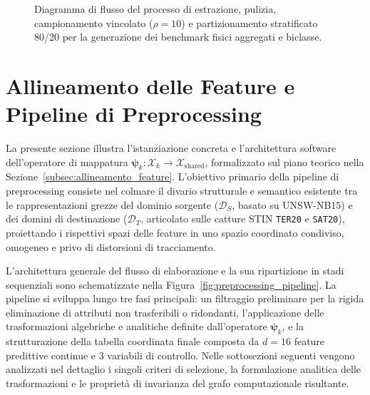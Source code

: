 \begin{figure}[H]
\caption{Diagramma di flusso del processo di estrazione, pulizia, campionamento vincolato ($\rho=10$) e partizionamento stratificato 80/20 per la generazione dei benchmark fisici aggregati e biclasse.}
\label{fig:benchmark_generation_pipeline}
\end{figure}


\section{Allineamento delle Feature e Pipeline di Preprocessing}
\label{sec:preprocessing_implementazione}

La presente sezione illustra l'istanziazione concreta e l'architettura software dell'operatore di mappatura $\boldsymbol{\psi}_k : \mathcal{X}_k \to \mathcal{X}_{\text{shared}}$, formalizzato sul piano teorico nella Sezione~\ref{subsec:allineamento_feature}. 
L'obiettivo primario della pipeline di preprocessing consiste nel colmare il divario strutturale e semantico esistente tra le rappresentazioni grezze del dominio sorgente ($\mathcal{D}_S$, basato su UNSW-NB15) e dei domini di destinazione ($\mathcal{D}_T$, articolato sulle catture STIN \texttt{TER20} e \texttt{SAT20}), proiettando i rispettivi spazi delle feature in uno spazio coordinato condiviso, omogeneo e privo di distorsioni di tracciamento.

L'architettura generale del flusso di elaborazione e la sua ripartizione in stadi sequenziali sono schematizzate nella Figura~\ref{fig:preprocessing_pipeline}. 
La pipeline si sviluppa lungo tre fasi principali: un filtraggio preliminare per la rigida eliminazione di attributi non trasferibili o ridondanti, l'applicazione delle trasformazioni algebriche e analitiche definite dall'operatore $\boldsymbol{\psi}_k$, e la strutturazione della tabella coordinata finale composta da $d = 16$ feature predittive continue e 3 variabili di controllo. 
Nelle sottosezioni seguenti vengono analizzati nel dettaglio i singoli criteri di selezione, la formulazione analitica delle trasformazioni e le proprietà di invarianza del grafo computazionale risultante.

